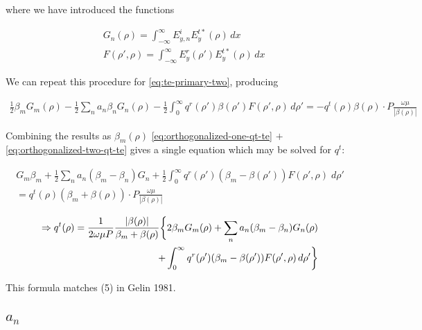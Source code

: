 \documentclass[11pt, oneside]{article}   	%
\begin{document}
\noindent where we have introduced the functions

\begin{align}
&G_{n}(\rho) = \int_{-\infty}^{\infty} E_{y,n}^{i} E_{y}^{t*}(\rho) \, dx\\
&F (\rho ',\rho) = \int_{-\infty}^{\infty} E_{y}^{r} (\rho ') E_{y}^{t*} (\rho) \, dx
\end{align}

We can repeat this procedure for \eqref{eq:te-primary-two}, producing

\begin{align}
\frac{1}{2} \beta_{m} G_{m}(\rho)
- \frac{1}{2} \sum_{n} a_{n} \beta_{n} G_{n}(\rho)
- \frac{1}{2} \int_{0}^{\infty} q^{r} (\rho ') \beta (\rho ') F(\rho ',\rho) \, d\rho '
= -q^{t}(\rho) \beta (\rho) \cdot P \frac{\omega \mu}{|\beta (\rho)|}
\label{eq:orthogonalized-two-qt-te}
\end{align}

Combining the results as $\beta_{m} (\rho)$ \eqref{eq:orthogonalized-one-qt-te} $ + $ \eqref{eq:orthogonalized-two-qt-te} gives a single equation which may be solved for $q^{t}$:

\begin{align}
G_{m} \beta_{m} + \frac{1}{2} \sum_{n} a_{n} (\beta_{m}-\beta_{n}) G_{n} + \frac{1}{2} \int_{0}^{\infty} q^{r} (\rho ') (\beta_{m} - \beta(\rho ')) F(\rho ', \rho) \; d\rho ' \nonumber \\
= q^{t}(\rho) (\beta_{m} + \beta(\rho)) \cdot P \frac{\omega \mu}{|\beta (\rho)|}
\end{align}

\begin{equation}
\begin{split}
\Rightarrow
q^{t}(\rho) = 
\frac{1}{2 \omega \mu P} \frac{|\beta (\rho)|}{\beta_{m} + \beta (\rho)}
\bigg\{2 \beta_{m} G_{m}(\rho) + \sum_{n} a_{n} (\beta_{m} - \beta_{n}) G_{n}(\rho) \vphantom{\int_{0}^{\infty}} \\
+ \int_{0}^{\infty} q^{r} (\rho ') (\beta_{m} - \beta (\rho ')) F(\rho ',\rho) \, d\rho ' \bigg\}
\end{split}
\end{equation}

\noindent This formula matches (5) in Gelin 1981.



\subsection{$a_{n}$}
\end{document}
